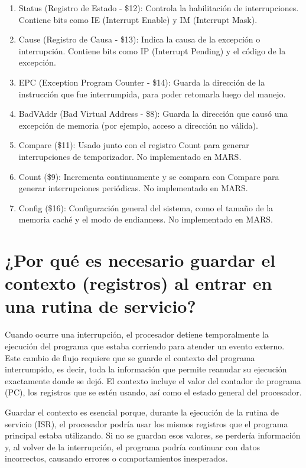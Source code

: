 \documentclass{article}
\begin{document}
\begin{enumerate}
\item Status (Registro de Estado - \$12): Controla la habilitación de interrupciones. Contiene bits como IE (Interrupt Enable) y IM (Interrupt Mask).
\item Cause (Registro de Causa - \$13): Indica la causa de la excepción o interrupción. Contiene bits como IP (Interrupt Pending) y el código de la excepción.
\item EPC (Exception Program Counter - \$14): Guarda la dirección de la instrucción que fue interrumpida, para poder retomarla luego del manejo.
\item BadVAddr (Bad Virtual Address - \$8): Guarda la dirección que causó una excepción de memoria (por ejemplo, acceso a dirección no válida).
\item Compare (\$11): Usado junto con el registro Count para generar interrupciones de temporizador. No implementado en MARS.
\item Count (\$9): Incrementa continuamente y se compara con Compare para generar interrupciones periódicas. No implementado en MARS.
\item Config (\$16): Configuración general del sistema, como el tamaño de la memoria caché y el modo de endianness. No implementado en MARS.
\end{enumerate}

\section{¿Por qué es necesario guardar el contexto (registros) al entrar en una rutina de servicio?}

Cuando ocurre una interrupción, el procesador detiene temporalmente la ejecución del programa que estaba corriendo para atender un evento externo. Este cambio de flujo requiere que se guarde el contexto del programa interrumpido, es decir, toda la información que permite reanudar su ejecución exactamente donde se dejó. El contexto incluye el valor del contador de programa (PC), los registros que se estén usando, así como el estado general del procesador. \newline

Guardar el contexto es esencial porque, durante la ejecución de la rutina de servicio (ISR), el procesador podría usar los mismos registros que el programa principal estaba utilizando. Si no se guardan esos valores, se perdería información y, al volver de la interrupción, el programa podría continuar con datos incorrectos, causando errores o comportamientos inesperados. \newline
\end{document}
